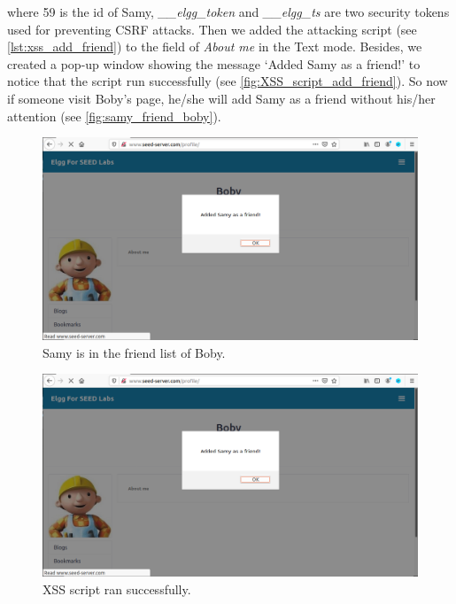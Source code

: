 where 59 is the id of Samy, \emph{\_\_elgg\_token} and \emph{\_\_elgg\_ts} are two security tokens
used for preventing CSRF attacks. Then we added the attacking script (see \autoref{lst:xss_add_friend})
to the field of \emph{About me} in the Text mode. Besides, we created a pop-up window showing
the message `Added Samy as a friend!' to notice that the script run successfully (see
\autoref{fig:XSS_script_add_friend}). So now if someone visit Boby's page, he/she will add
Samy as a friend without his/her attention (see \autoref{fig:samy_friend_boby}).

\begin{figure}[h!]
    \centering
    \includegraphics[height=\textheight,width=\textwidth,keepaspectratio]
    {figures/XSS_add_friend.png}
    \caption{Samy is in the friend list of Boby.}
    \label{fig:samy_friend_boby}
\end{figure}

\begin{figure}[h!]
    \centering
    \includegraphics[height=\textheight,width=\textwidth,keepaspectratio]
    {figures/XSS_add_friend.png}
    \caption{XSS script ran successfully.}
    \label{fig:XSS_script_add_friend}
\end{figure}


